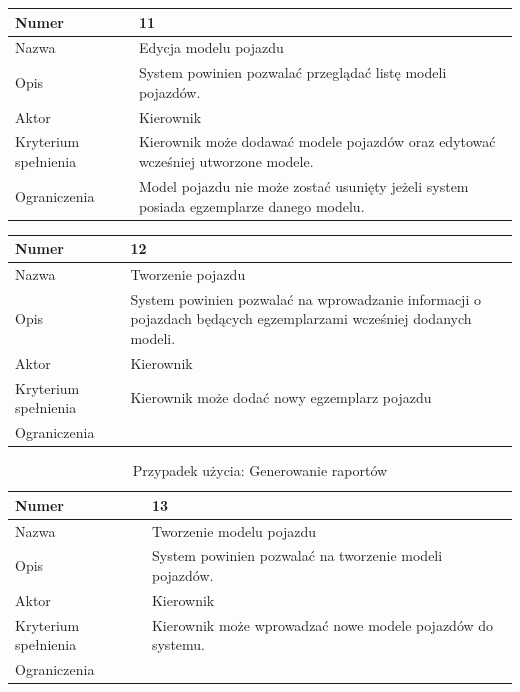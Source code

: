 \documentclass[eng,printmode,openany]{mgr}
\begin{document}
	\begin{table}[H]
		\begin{tabularx}{\textwidth}{|l|X|}
			\hline
			Numer                & 11  \\ \hline
			Nazwa                & Edycja modelu pojazdu \\ \hline
			Opis                 & System powinien pozwalać przeglądać listę modeli pojazdów. \\ \hline
			Aktor                & Kierownik \\ \hline
			Kryterium spełnienia & Kierownik może dodawać modele pojazdów oraz edytować wcześniej utworzone modele. \\ \hline
			Ograniczenia         & Model pojazdu nie może zostać usunięty jeżeli system posiada egzemplarze danego modelu. \\ \hline
		\end{tabularx}
	\end{table}	

	\begin{table}[H]
		\begin{tabularx}{\textwidth}{|l|X|}
			\hline
			Numer                & 12  \\ \hline
			Nazwa                & Tworzenie pojazdu \\ \hline
			Opis                 & System powinien pozwalać na wprowadzanie informacji o pojazdach będących egzemplarzami wcześniej dodanych modeli. \\ \hline
			Aktor                & Kierownik \\ \hline
			Kryterium spełnienia & Kierownik może dodać nowy egzemplarz pojazdu  \\ \hline
			Ograniczenia         &  \\ \hline
		\end{tabularx}
	\end{table}	

	\begin{table}[H]
		\caption{Przypadek użycia: Generowanie raportów}
		\begin{tabularx}{\textwidth}{|l|X|}
			\hline
			Numer                & 13  \\ \hline
			Nazwa                & Tworzenie modelu pojazdu \\ \hline
			Opis                 & System powinien pozwalać na tworzenie modeli pojazdów. \\ \hline
			Aktor                & Kierownik \\ \hline
			Kryterium spełnienia & Kierownik może wprowadzać nowe modele pojazdów do systemu. \\ \hline
			Ograniczenia         &  \\ \hline
		\end{tabularx}
	\end{table}	
\end{document}
